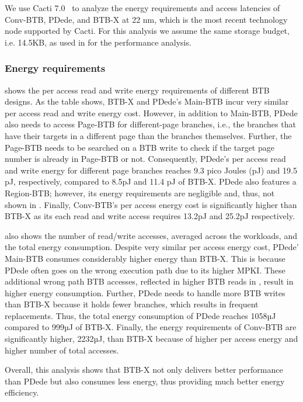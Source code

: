 We use Cacti 7.0~\cite{cacti} to analyze the energy requirements and access latencies of Conv-BTB, PDede, and BTB-X at 22 nm, which is the most recent technology node supported by Cacti. For this analysis we assume the same storage budget, i.e. 14.5KB, as used in  for the performance analysis.

\subsubsection{Energy requirements}
 shows the per access read and write energy requirements of different BTB designs. As the table shows, BTB-X and PDede's Main-BTB incur very similar per access read and write energy cost. However, in addition to Main-BTB, PDede also needs to access Page-BTB for different-page branches, i.e., the branches that have their targets in a different page than the branches themselves. Further, the Page-BTB needs to be searched on a BTB write to check if the target page number is already in Page-BTB or not. Consequently, PDede's per access read and write energy for different page branches reaches 9.3 pico Joules (pJ) and 19.5 pJ, respectively, compared to 8.5pJ and 11.4 pJ of BTB-X. PDede also features a Region-BTB; however, its energy requirements are negligible and, thus, not shown in . Finally, Conv-BTB's per access energy cost is significantly higher than BTB-X as its each read and write access requires 13.2pJ and 25.2pJ respectively.

 also shows the number of read/write accesses, averaged across the workloads, and the total energy consumption. Despite very similar per access energy cost, PDede' Main-BTB consumes considerably higher energy than BTB-X. This is because PDede often goes on the wrong execution path due to its higher MPKI. These additional wrong path BTB accesses, reflected in higher BTB reads in , result in higher energy consumption. Further, PDede needs to handle more BTB writes than BTB-X because it holds fewer branches, which results in frequent replacements. Thus, the total energy consumption of PDede reaches 1058µJ compared to 999µJ of BTB-X. Finally, the energy requirements of Conv-BTB are significantly higher, 2232µJ, than BTB-X because of higher per access energy and higher number of total accesses.

Overall, this analysis shows that BTB-X not only delivers better performance than PDede but also consumes less energy, thus providing much better energy efficiency.

